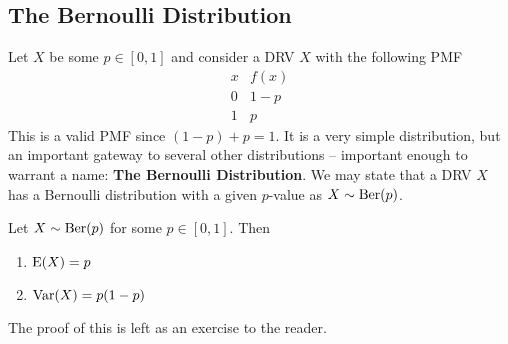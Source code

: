 \documentclass{report}
\begin{document}
\subsection{The Bernoulli Distribution}
\newcommand{\ber}{\textup{Ber}}
Let $X$ be some $p\in[0,1]$ and consider a DRV $X$ with the following PMF
\[
    \begin{array}{c|c}
         x & f(x) \\
         \hline
         0 & 1-p \\
         1 & p
    \end{array}
\]
This is a valid PMF since $(1-p)+p=1$. It is a very simple distribution, but an important gateway to several other distributions -- important enough to warrant a name: \textbf{The Bernoulli Distribution}. We may state that a DRV $X$ has a Bernoulli distribution with a given $p$-value as $X\sim\ber(p)$.
\begin{theorem}
    Let $X\sim\ber(p)$ for some $p\in[0,1]$. Then
    \begin{enumerate}
        \item $\textup{E}(X)=p$
        \item $\textup{Var}(X)=p(1-p)$
    \end{enumerate}

    The proof of this is left as an exercise to the reader.
\end{theorem}
\label{thm:propsbin}
\end{document}
